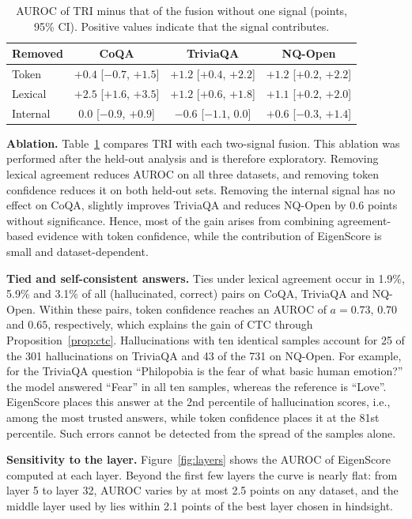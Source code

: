 \documentclass[10pt]{article}
\begin{document}
\begin{table}[t]
\centering
\caption{AUROC of TRI minus that of the fusion without one signal (points, 95\% CI). Positive values indicate that the signal contributes.}
\label{tab:ablation}
\small
\begin{tabular}{@{}lccc@{}}
\toprule
Removed & CoQA & TriviaQA & NQ-Open \\
\midrule
Token & $+0.4$ [$-0.7$, $+1.5$] & $+1.2$ [$+0.4$, $+2.2$] & $+1.2$ [$+0.2$, $+2.2$] \\
Lexical & $+2.5$ [$+1.6$, $+3.5$] & $+1.2$ [$+0.6$, $+1.8$] & $+1.1$ [$+0.2$, $+2.0$] \\
Internal & $0.0$ [$-0.9$, $+0.9$] & $-0.6$ [$-1.1$, $0.0$] & $+0.6$ [$-0.3$, $+1.4$] \\
\bottomrule
\end{tabular}
\end{table}

\textbf{Ablation.} Table~\ref{tab:ablation} compares TRI with each two-signal fusion. This ablation was performed after the held-out analysis and is therefore exploratory. Removing lexical agreement reduces AUROC on all three datasets, and removing token confidence reduces it on both held-out sets. Removing the internal signal has no effect on CoQA, slightly improves TriviaQA and reduces NQ-Open by 0.6 points without significance. Hence, most of the gain arises from combining agreement-based evidence with token confidence, while the contribution of EigenScore is small and dataset-dependent.

\textbf{Tied and self-consistent answers.} Ties under lexical agreement occur in 1.9\%, 5.9\% and 3.1\% of all (hallucinated, correct) pairs on CoQA, TriviaQA and NQ-Open. Within these pairs, token confidence reaches an AUROC of $a=0.73$, $0.70$ and $0.65$, respectively, which explains the gain of CTC through Proposition~\ref{prop:ctc}. Hallucinations with ten identical samples account for 25 of the 301 hallucinations on TriviaQA and 43 of the 731 on NQ-Open. For example, for the TriviaQA question ``Philopobia is the fear of what basic human emotion?'' the model answered ``Fear'' in all ten samples, whereas the reference is ``Love''. EigenScore places this answer at the 2nd percentile of hallucination scores, i.e., among the most trusted answers, while token confidence places it at the 81st percentile. Such errors cannot be detected from the spread of the samples alone.

\textbf{Sensitivity to the layer.} Figure~\ref{fig:layers} shows the AUROC of EigenScore computed at each layer. Beyond the first few layers the curve is nearly flat: from layer 5 to layer 32, AUROC varies by at most 2.5 points on any dataset, and the middle layer used by \citet{chen2024inside} lies within 2.1 points of the best layer chosen in hindsight.
\end{document}
